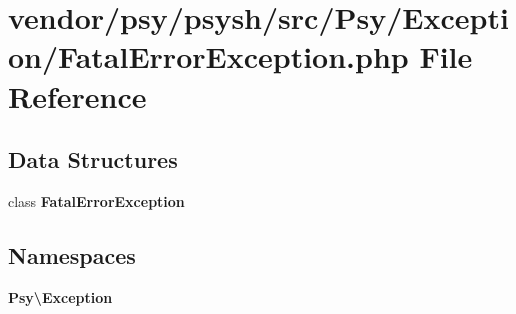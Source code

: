 \section{vendor/psy/psysh/src/\+Psy/\+Exception/\+Fatal\+Error\+Exception.php File Reference}
\label{psy_2psysh_2src_2_psy_2_exception_2_fatal_error_exception_8php}
\subsection*{Data Structures}
\begin{DoxyCompactItemize}
\item 
class {\bf Fatal\+Error\+Exception}
\end{DoxyCompactItemize}
\subsection*{Namespaces}
\begin{DoxyCompactItemize}
\item 
 {\bf Psy\textbackslash{}\+Exception}
\end{DoxyCompactItemize}
